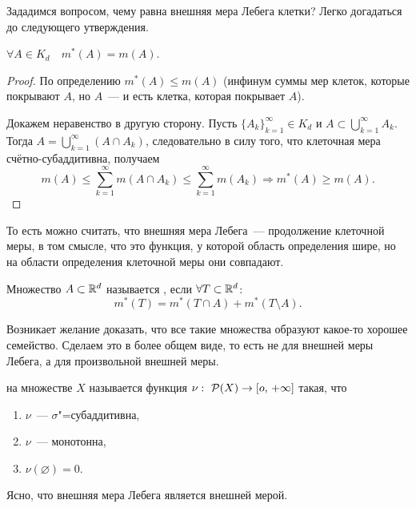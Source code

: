 Зададимся вопросом, чему равна внешняя мера Лебега клетки? Легко догадаться до следующего утверждения.

\begin{claim}
    $\forall A\in K_d\quad m^*(A)=m(A)$.

    \begin{proof}
        По определению $m^*(A)\leqslant m(A)$ (инфинум суммы мер клеток, которые покрывают $A$, но $A$~--- и есть клетка, которая покрывает $A$).

        Докажем неравенство в другую сторону. Пусть $\{A_k\}_{k=1}^{\infty}\in K_d$ и $A\subset\bigcup\limits_{k=1}^{\infty}A_k$.
        Тогда $A = \bigcup\limits_{k=1}^{\infty}\left(A\cap A_k\right)$, следовательно в силу того, что клеточная мера счётно-субаддитивна, получаем
        \[
            m(A)\leqslant\sum_{k=1}^{\infty} m(A\cap A_k)\leqslant\sum_{k=1}^{\infty}m(A_k)\Rightarrow m^*(A)\geqslant m(A).
        \]

    \end{proof}
\end{claim}

То есть можно считать, что внешняя мера Лебега~--- продолжение клеточной меры, в том смысле, что это функция, у которой область определения шире,
но на области определения клеточной меры они совпадают.

\begin{definition}
    Множество $A\subset \mathbb{R}^d$ называется , если $\forall T\subset\mathbb{R}^d$:
    \[
        m^*(T)=m^*(T\cap A)+m^*(T\setminus A).
    \]
\end{definition}

Возникает желание доказать, что все такие множества образуют какое-то хорошее семейство. Сделаем это в более общем виде, то есть
не для внешней меры Лебега, а для произвольной внешней меры.

\begin{definition}
     на множестве $X$ называется функция $\nu:\ \CP(X)\rightarrow[o,\,+\infty]$ такая, что
    \begin{enumerate}[label=\arabic*\degree]
        \item $\nu$~--- $\sigma$"=субаддитивна,
        \item $\nu$~--- монотонна,
        \item $\nu(\varnothing)=0$.
    \end{enumerate}

    \begin{remark}
        Ясно, что внешняя мера Лебега является внешней мерой.
    \end{remark}
\end{definition}

